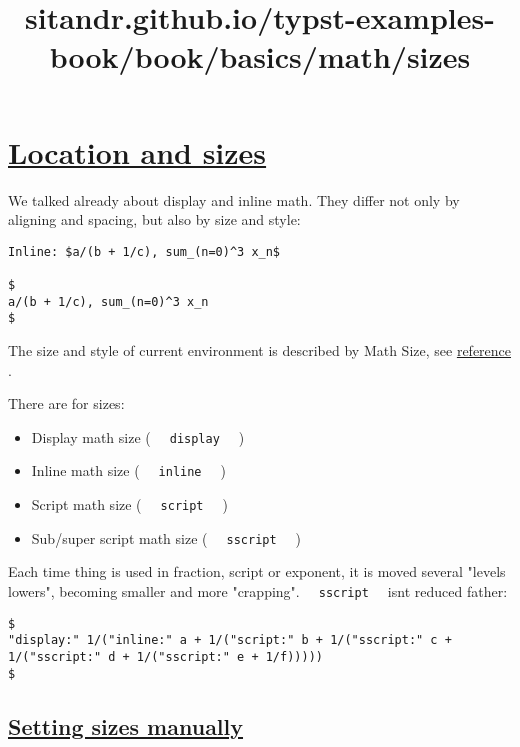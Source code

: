 \title{sitandr.github.io/typst-examples-book/book/basics/math/sizes}

\section{\texorpdfstring{\hyperref[location-and-sizes]{Location and
sizes}}{Location and sizes}}\label{location-and-sizes}

We talked already about display and inline math. They differ not only by
aligning and spacing, but also by size and style:

\begin{verbatim}
Inline: $a/(b + 1/c), sum_(n=0)^3 x_n$

$
a/(b + 1/c), sum_(n=0)^3 x_n
$
\end{verbatim}

\pandocbounded{}

The size and style of current environment is described by Math Size, see
\href{https://typst.app/docs/reference/math/sizes}{reference} .

There are for sizes:

\begin{itemize}
\tightlist
\item
  Display math size ( \texttt{\ }{\texttt{\ display\ }}\texttt{\ } )
\item
  Inline math size ( \texttt{\ }{\texttt{\ inline\ }}\texttt{\ } )
\item
  Script math size ( \texttt{\ }{\texttt{\ script\ }}\texttt{\ } )
\item
  Sub/super script math size (
  \texttt{\ }{\texttt{\ sscript\ }}\texttt{\ } )
\end{itemize}

Each time thing is used in fraction, script or exponent, it is moved
several "levels lowers", becoming smaller and more "crapping".
\texttt{\ }{\texttt{\ sscript\ }}\texttt{\ } isn\textquotesingle t
reduced father:

\begin{verbatim}
$
"display:" 1/("inline:" a + 1/("script:" b + 1/("sscript:" c + 1/("sscript:" d + 1/("sscript:" e + 1/f)))))
$
\end{verbatim}

\pandocbounded{}

\subsection{\texorpdfstring{\hyperref[setting-sizes-manually]{Setting
sizes manually}}{Setting sizes manually}}\label{setting-sizes-manually}

